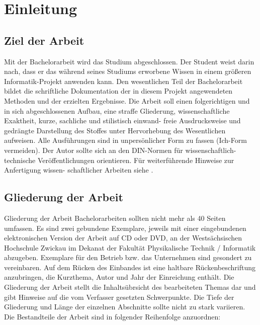 \chapter{Einleitung}
\label{chap:einleitung}


\section{Ziel der Arbeit}
\label{sec:ziel}

Mit der Bachelorarbeit wird das Studium abgeschlossen. Der Student weist darin
nach, dass er das während seines Studiums erworbene Wissen in einem größeren
Informatik-Projekt anwenden kann. Den wesentlichen Teil der Bachelorarbeit bildet
die schriftliche Dokumentation der in diesem Projekt angewendeten Methoden und
der erzielten Ergebnisse.
Die Arbeit soll einen folgerichtigen und in sich abgeschlossenen Aufbau, eine straffe
Gliederung, wissenschaftliche Exaktheit, kurze, sachliche und stilistisch einwand-
freie Ausdrucksweise und gedrängte Darstellung des Stoffes unter Hervorhebung des
Wesentlichen aufweisen. Alle Ausführungen sind in unpersönlicher Form zu fassen
(Ich-Form vermeiden).
Der Autor sollte sich an den \acs{DIN}-Normen für wissenschaftlich-technische Veröffentlichungen 
\cite{DIN05} orientieren. Für weiterführende Hinweise zur Anfertigung wissen-
schaftlicher Arbeiten siehe \cite{Rec06,Bri07,DLLS05}.

\section{Gliederung der Arbeit}
\label{sec:gliederung}

Gliederung der Arbeit
Bachelorarbeiten sollten nicht mehr als 40 Seiten umfassen. Es sind zwei gebundene
Exemplare, jeweils mit einer eingebundenen elektronischen Version der Arbeit auf
\acs{CD} oder \acs{DVD}, an der Westsächsischen Hochschule Zwickau im Dekanat der Fakultät
Physikalische Technik / Informatik abzugeben. Exemplare für den Betrieb bzw. das
Unternehmen sind gesondert zu vereinbaren.
Auf dem Rücken des Einbandes ist eine haltbare Rückenbeschriftung anzubringen,
die Kurzthema, Autor und Jahr der Einreichung enthält. 
Die Gliederung der Arbeit stellt die Inhaltsübrsicht des bearbeiteten Themas dar
und gibt Hinweise auf die vom Verfasser gesetzten Schwerpunkte.
Die Tiefe der Gliederung und Länge der einzelnen Abschnitte sollte nicht zu stark
variieren. Die Bestandteile der Arbeit sind in folgender Reihenfolge anzuordnen:\\

